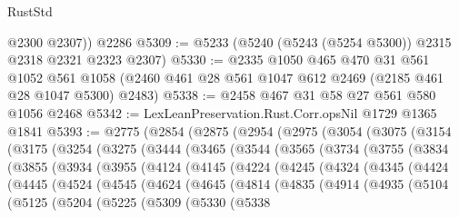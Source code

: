 \begin{lexlean}{RustStd}
\begin{coremodule}
        @2300
        @2307))
    @2286
@5309 := @5233 (@5240 (@5243 (@5254 @5300)) @2315 @2318 @2321 @2323 @2307)
@5330 := @2335
    @1050
    @465
    @470
    @31
    @561
    @1052
    @561
    @1058
    (@2460 @461 @28 @561 @1047 @612 @2469 (@2185 @461 @28 @1047 @5300) @2483)
@5338 := @2458 @467 @31 @58 @27 @561 @580 @1056 @2468
@5342 := LexLeanPreservation.Rust.Corr.opsNil @1729 @1365 @1841
@5393 := @2775
    (@2854
      (@2875
        (@2954
          (@2975
            (@3054
              (@3075
                (@3154
                  (@3175
                    (@3254
                      (@3275
                        (@3444
                          (@3465
                            (@3544
                              (@3565
                                (@3734
                                  (@3755
                                    (@3834
                                      (@3855
                                        (@3934
                                          (@3955
                                            (@4124
                                              (@4145
                                                (@4224
                                                  (@4245
                                                    (@4324
                                                      (@4345
                                                        (@4424
                                                          (@4445
                                                            (@4524
                                                              (@4545
                                                                (@4624
                                                                  (@4645
                                                                    (@4814
                                                                      (@4835
                                                                        (@4914
                                                                          (@4935
                                                                            (@5104
                                                                              (@5125
                                                                                (@5204
                                                                                  (@5225
                                                                                    (@5309
                                                                                      (@5330
                                                                                        (@5338

\end{coremodule}
\end{lexlean}
